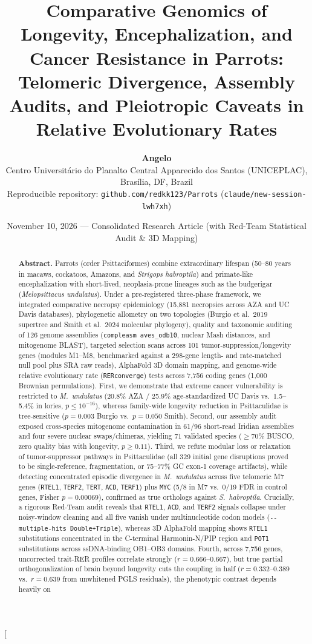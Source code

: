 \documentclass[10pt,a4paper,twocolumn]{article}
\title{\vspace{-0.8cm}\textbf{\Large Comparative Genomics of Longevity, Encephalization, and Cancer Resistance in Parrots: Telomeric Divergence, Assembly Audits, and Pleiotropic Caveats in Relative Evolutionary Rates}}
\author{
\textbf{Angelo}\\
\small Centro Universit\'ario do Planalto Central Apparecido dos Santos (UNICEPLAC), Bras\'ilia, DF, Brazil\\
\small Reproducible repository: \texttt{github.com/redkk123/Parrots} (\texttt{claude/new-session-lwh7xh})
}
\date{\small November 10, 2026 --- Consolidated Research Article (with Red-Team Statistical Audit \& 3D Mapping)}
\begin{document}
\twocolumn[{
  \begin{@twocolumnfalse}
    \maketitle
    \vspace{-0.4cm}
    \begin{abstract}
    \noindent \textbf{Abstract.} Parrots (order Psittaciformes) combine extraordinary lifespan (50--80 years in macaws, cockatoos, Amazons, and \textit{Strigops habroptila}) and primate-like encephalization with short-lived, neoplasia-prone lineages such as the budgerigar (\textit{Melopsittacus undulatus}). Under a pre-registered three-phase framework, we integrated comparative necropsy epidemiology (15,881 necropsies across AZA and UC Davis databases), phylogenetic allometry on two topologies (Burgio et al.\ 2019 supertree and Smith et al.\ 2024 molecular phylogeny), quality and taxonomic auditing of 126 genome assemblies (\texttt{compleasm aves\_odb10}, nuclear Mash distances, and mitogenome BLAST), targeted selection scans across 101 tumor-suppression/longevity genes (modules M1--M8, benchmarked against a 298-gene length- and rate-matched null pool plus SRA raw reads), AlphaFold 3D domain mapping, and genome-wide relative evolutionary rate (\texttt{RERconverge}) tests across 7,756 coding genes (1,000 Brownian permulations). First, we demonstrate that extreme cancer vulnerability is restricted to \textit{M.\ undulatus} (20.8\% AZA / 25.9\% age-standardized UC Davis vs.\ 1.5--5.4\% in lories, $p \le 10^{-16}$), whereas family-wide longevity reduction in Psittaculidae is tree-sensitive ($p = 0.003$ Burgio vs.\ $p = 0.050$ Smith). Second, our assembly audit exposed cross-species mitogenome contamination in 61/96 short-read Iridian assemblies and four severe nuclear swaps/chimeras, yielding 71 validated species ($\ge 70\%$ BUSCO, zero quality bias with longevity, $p \ge 0.11$). Third, we refute modular loss or relaxation of tumor-suppressor pathways in Psittaculidae (all 329 initial gene disruptions proved to be single-reference, fragmentation, or 75--77\% GC exon-1 coverage artifacts), while detecting concentrated episodic divergence in \textit{M.\ undulatus} across five telomeric M7 genes (\texttt{RTEL1}, \texttt{TERF2}, \texttt{TERT}, \texttt{ACD}, \texttt{TERF1}) plus \texttt{MYC} (5/8 in M7 vs.\ 0/19 FDR in control genes, Fisher $p = 0.00069$), confirmed as true orthologs against \textit{S.\ habroptila}. Crucially, a rigorous Red-Team audit reveals that \texttt{RTEL1}, \texttt{ACD}, and \texttt{TERF2} signals collapse under noisy-window cleaning and all five vanish under multinucleotide codon models (\texttt{-{}-multiple-hits Double+Triple}), whereas 3D AlphaFold mapping shows \texttt{RTEL1} substitutions concentrated in the C-terminal Harmonin-N/PIP region and \texttt{POT1} substitutions across ssDNA-binding OB1--OB3 domains. Fourth, across 7,756 genes, uncorrected trait-RER profiles correlate strongly ($r = 0.666\text{--}0.667$), but true partial orthogonalization of brain beyond longevity cuts the coupling in half ($r = 0.332\text{--}0.389$ vs.\ $r = 0.639$ from unwhitened PGLS residuals), the phenotypic contrast depends heavily on 
\end{abstract}
\end{@twocolumnfalse}}
\end{document}
